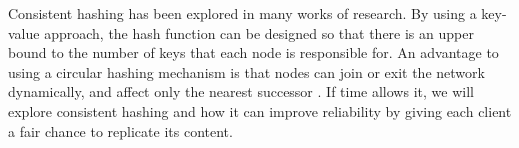 Consistent hashing has been explored in many works of research.
By using a key-value approach, the hash function can be designed
so that there is an upper bound to the number of keys that each
node is responsible for. An advantage to using a circular hashing
mechanism is that nodes can join or exit the network
dynamically, and affect only the nearest successor \cite{chord}.
If time allows it, we will explore consistent hashing and how
it can improve reliability by giving each client a fair chance
to replicate its content.

\label{background}
